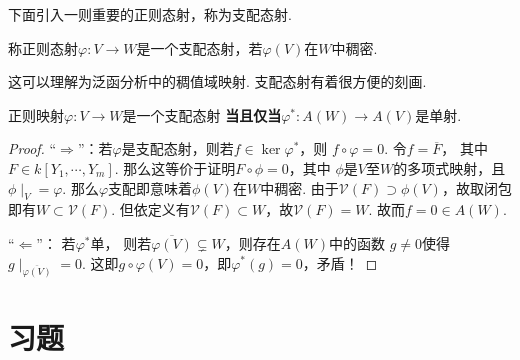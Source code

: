     下面引入一则重要的正则态射，称为支配态射.

    \begin{definition}
        称正则态射$\varphi\colon V \rightarrow W$是一个支配态射，若$\varphi(V)$在$W$中稠密.
    \end{definition}

    这可以理解为泛函分析中的稠值域映射. 支配态射有着很方便的刻画.

    \begin{proposition}
        正则映射$\varphi\colon V \rightarrow W$是一个支配态射
        \textbf{当且仅当}$\varphi^{*}\colon A(W) \rightarrow A(V)$是单射.
    \end{proposition}
    \begin{proof}
        ``$\Rightarrow$''：若$\varphi$是支配态射，则若$f \in \ker\varphi^{*}$，则
        $f \circ \varphi =0$. 令$f = \overline{F}$，
        其中$F \in k[Y_{1},\cdots,Y_{m}]$. 那么这等价于证明$F \circ \phi =0$，其中
        $\phi$是$V$至$W$的多项式映射，且$\phi \mid_{V} = \varphi$. 
        那么$\varphi$支配即意味着$\phi(V)$在$W$中稠密. 
        由于$\mathcal{V}(F) \supset \phi(V)$，故取闭包即有$W \subset \mathcal{V}(F)$.
        但依定义有$\mathcal{V}(F) \subset W$，故$\mathcal{V}(F)=W$. 
        故而$f=0 \in A(W)$.

        ``$\Leftarrow$''： 若$\varphi^{*}$单，
        则若$\overline{\varphi(V)} \subsetneq W$，则存在$A(W)$中的函数
        $g \neq 0$使得$g\mid_{\overline{\varphi(V)}} = 0$. 
        这即$g \circ \varphi(V)=0$，即$\varphi^{*}(g)=0$，矛盾！
    \end{proof}

\section*{习题}